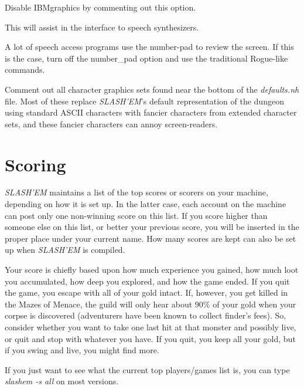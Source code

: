 \blist{}

\item[\bb{IBMgraphics}]
Disable IBMgraphics by commenting out this option.

\item[\bb{menustyle:traditional}]
This will assist in the interface to speech synthesizers.

\item[\bb{!number\_pad}]
A lot of speech access programs use the number-pad to review the screen.
If this is the case, turn off the number\_pad option and use the traditional
Rogue-like commands.

\item[\bb{Character graphics}]
Comment out all character graphics sets found near the bottom of the
{\it defaults.nh\/} file.  Most of these replace {\it {\it SLASH'EM\/}\/}'s
default representation of the dungeon using standard ASCII characters
with fancier characters from extended character sets, and these fancier
characters can annoy screen-readers.
\elist
\nd %
\section{Scoring}


{\it SLASH'EM\/} maintains a list of the top scores or scorers on your machine,
depending on how it is set up.  In the latter case, each account on
the machine can post only one non-winning score on this list.  If
you score higher than someone else on this list, or better your
previous score, you will be inserted in the proper place under your
current name.  How many scores are kept can also be set up when
{\it SLASH'EM\/} is compiled.

Your score is chiefly based upon how much experience you gained, how
much loot you accumulated, how deep you explored, and how the game
ended.  If you quit the game, you escape with all of your gold intact.
If, however, you get killed in the Mazes of Menace, the guild will
only hear about 90\% of your gold when your corpse is discovered
(adventurers have been known to collect finder's fees).  So, consider
whether you want to take one last hit at that monster and possibly
live, or quit and stop with whatever you have.  If you quit, you keep
all your gold, but if you swing and live, you might find more.

If you just want to see what the current top players/games list is, you
can type {\it slashem -s all\/} on most versions.

